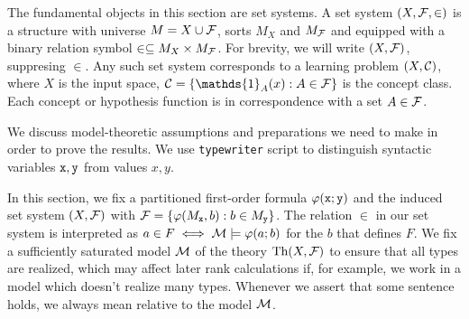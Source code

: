 \begin{remark}
\begin{outline}
\0 The fundamental objects in this section are set systems.
    \1 A set system $(X,\mathcal{F}, \in)$ is a structure with universe $M=X\cup \mathcal{F}$, sorts $M_X$ and $M_{\mathcal{F}}$ and equipped with a binary relation symbol $\in\subseteq M_X\times M_{\mathcal{F}}$. For brevity, we will write $(X,\mathcal{F})$, suppresing $\in$.
    \1 Any such set system corresponds to a learning problem $(X,\mathcal{C})$, where $X$ is the input space, $\C=\{\mathds{1}_A (x) : A \in\cF\}$ is the concept class. Each concept or hypothesis function is in correspondence with a set $A\in \mathcal{F}$.
\end{outline}
\end{remark}

\begin{remark}
We discuss model-theoretic assumptions and preparations we need to make in order to prove the results. We use \texttt{typewriter} script to distinguish syntactic variables $\texttt{x}, \texttt{y}$ from values $x, y$. 
\begin{outline}
    \1 In this section, we fix a partitioned first-order formula $\varphi(\texttt{x};\texttt{y})$ and the induced set system $(X,\mathcal{F})$ with $\mathcal{F} = \{\varphi(M_{\texttt{x}},b) : b \in M_{\texttt{y}}\}$. The relation $\in$ in our set system is interpreted as $a\in F \iff \mathcal{M}\models\varphi(a;b)$ for the $b$ that defines $F$. 
    \1 We fix a sufficiently saturated model $\mathcal{M}$ of the theory $\operatorname{Th}(X,\mathcal{F})$ to ensure that all types are realized, which may affect later rank calculations if, for example, we work in a model which doesn't realize many types. Whenever we assert that some sentence holds, we always mean relative to the model $\mathcal{M}$.
\end{outline}
\end{remark}


